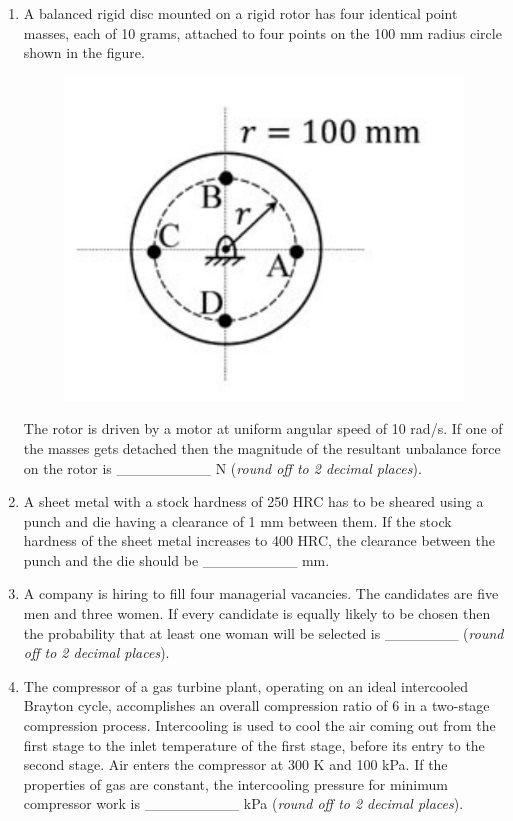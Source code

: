\documentclass[12pt,onecolumn]{article}
\begin{document}
\begin{enumerate}
    \item A balanced rigid disc mounted on a rigid rotor has four identical point masses, each of 10 grams, attached to four points on the 100 mm radius circle shown in the figure.
          \begin{figure}[H]
              \centering
              \includegraphics[scale=0.3]{q21}
              \label{fig:q21}
          \end{figure}
          The rotor is driven by a motor at uniform angular speed of 10 rad/s. If one of the masses gets detached then the magnitude of the resultant unbalance force on the rotor is \_\_\_\_\_\_\_\_\_ N (\textit{round off to 2 decimal places}).

    \item A sheet metal with a stock hardness of 250 HRC has to be sheared using a punch and die having a clearance of 1 mm between them. If the stock hardness of the sheet metal increases to 400 HRC, the clearance between the punch and the die should be \_\_\_\_\_\_\_\_\_ mm.

    \item A company is hiring to fill four managerial vacancies. The candidates are five men and three women. If every candidate is equally likely to be chosen then the probability that at least one woman will be selected is \_\_\_\_\_\_\_ (\textit{round off to 2 decimal places}).

    \item The compressor of a gas turbine plant, operating on an ideal intercooled Brayton cycle, accomplishes an overall compression ratio of 6 in a two-stage compression process. Intercooling is used to cool the air coming out from the first stage to the inlet temperature of the first stage, before its entry to the second stage. Air enters the compressor at 300 K and 100 kPa. If the properties of gas are constant, the intercooling pressure for minimum compressor work is \_\_\_\_\_\_\_\_\_ kPa (\textit{round off to 2 decimal places}).


\end{enumerate}
\end{document}
